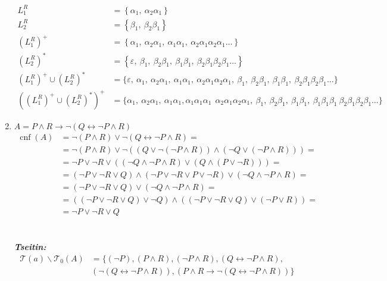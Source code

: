 \documentclass[a4paper,12pt, centered]{article}
\DeclareMathOperator{\cnf}{cnf}
\begin{document}
\begin{enumerate}
	\begin{align*}
		L_1^R&=\left\{\alpha_1,\>\alpha_2\alpha_1\right\}\\
		L_2^R&=\left\{\beta_1,\>\beta_2\beta_1\right\}\\
		\left(L_1^R\right)^+&=\left\{\alpha_1,\>\alpha_2\alpha_1,\>\alpha_1\alpha_1,\>\alpha_2\alpha_1\alpha_2\alpha_1\dots\right\}\\
		\left(L_2^R\right)^*&=\left\{\varepsilon,\>\beta_1,\>\beta_2\beta_1,\>\beta_1\beta_1,\>\beta_2\beta_1\beta_2\beta_1\dots\right\}\\
		\left(L_1^R \right)^+\cup \left(L_2^R \right)^*&=\{\varepsilon,\>\alpha_1,\>\alpha_2\alpha_1,\>\alpha_1\alpha_1,\>\alpha_2\alpha_1\alpha_2\alpha_1,\>\beta_1,\>\beta_2\beta_1,\>\beta_1\beta_1,\>\beta_2\beta_1\beta_2\beta_1\dots \}\\
		\left(\left(L_1^R \right)^+\cup \left(L_2^R \right)^*\right)^+&=\{\alpha_1,\>\alpha_2\alpha_1,\>\alpha_1\alpha_1,\alpha_1\alpha_1\alpha_1\>\>\alpha_2\alpha_1\alpha_2\alpha_1,\>\beta_1,\>\beta_2\beta_1,\>\beta_1\beta_1,\>\beta_1\beta_1\beta_1\>\beta_2\beta_1\beta_2\beta_1\dots \}
	\end{align*}
	\item $A=P\land R\to\neg(Q\leftrightarrow\neg P\land R)$
		\begin{align*}
			\cnf(A)&=\neg(P\land R)\lor\neg(Q\leftrightarrow\neg P\land R)=\\&=\neg(P\land R)\lor\neg((Q\lor\neg(\neg P\land R))\land(\neg Q\lor(\neg P\land R)))=\\&=\neg P\lor\neg R\lor((\neg Q\land\neg P\land R)\lor (Q\land(P\lor\neg R)))=\\&=(\neg P\lor \neg R\lor Q)\land (\neg P\lor \neg R\lor P\lor\neg R)\lor (\neg Q\land\neg P\land R)=\\&=(\neg P\lor \neg R\lor Q)\lor (\neg Q\land\neg P\land R)=\\&=((\neg P\lor \neg R\lor Q)\lor\neg Q)\land((\neg P\lor \neg R\lor Q)\lor(\neg P\lor R))=\\&=\neg P\lor\neg R\lor Q
		\end{align*}
		\\\\\emph{\textbf{Tseitin:}}\\
		\begin{align*}
			\mathcal{T}(a)\backslash\mathcal{T}_0(A)&=\{(\neg P),(P\land R),(\neg P\land R),(Q\leftrightarrow\neg P\land R),\\&(\neg(Q\leftrightarrow\neg P\land R)),(P\land R\to\neg(Q\leftrightarrow\neg P\land R))\}

\end{align*}
\end{enumerate}
\end{document}
